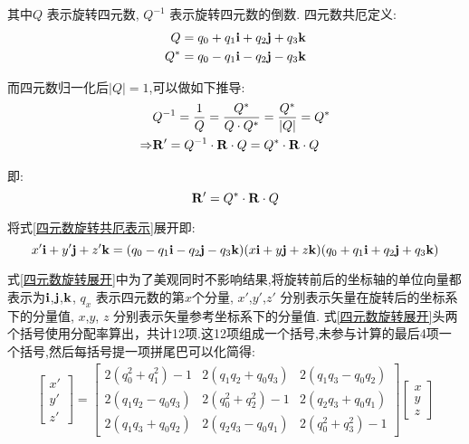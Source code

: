 其中$Q$         表示旋转四元数,
$Q^{-1}$        表示旋转四元数的倒数.
四元数共厄定义:
\begin{equation}\label{四元数共厄}
    \begin{split}
        Q   & = q_0 + q_1\mathbf{i} + q_2\mathbf{j} + q_3\mathbf{k} \\
        Q^* & = q_0 - q_1\mathbf{i} - q_2\mathbf{j} - q_3\mathbf{k}
    \end{split}
\end{equation} 

而四元数归一化后$|Q|=1$,可以做如下推导:
\begin{equation*}
    \begin{split}
                    & Q^{-1} = \frac{1}{Q} = \frac{Q^*}{Q \cdot Q^*} = \frac{Q^*}{|Q|} = Q^* \\
        \Rightarrow & \mathbf{R}'= Q^{-1} \cdot \mathbf{R} \cdot Q = Q^* \cdot \mathbf{R} \cdot Q
    \end{split}
\end{equation*}

即:
\begin{equation}\label{四元数旋转共厄表示}
    \mathbf{R}'= Q^* \cdot \mathbf{R} \cdot Q
\end{equation}

将式\ref{四元数旋转共厄表示}展开即:
\begin{equation}\label{四元数旋转展开}
    x'\mathbf{i} + y'\mathbf{j} + z'\mathbf{k} = (q_0 - q_1\mathbf{i} - q_2\mathbf{j} -q_3\mathbf{k})(x\mathbf{i} + y\mathbf{j} + z\mathbf{k})(q_0 + q_1\mathbf{i} + q_2\mathbf{j} + q_3\mathbf{k})
\end{equation}

式\ref{四元数旋转展开}中为了美观同时不影响结果,将旋转前后的坐标轴的单位向量都表示为$\mathbf{i}$,$\mathbf{j}$,$\mathbf{k}$,
$q_x$           表示四元数的第$x$个分量,
$x'$,$y'$,$z'$  分别表示矢量在旋转后的坐标系下的分量值,
$x$,$y$, $z$    分别表示矢量参考坐标系下的分量值.
式\ref{四元数旋转展开}头两个括号使用分配率算出，共计12项.这12项组成一个括号,未参与计算的最后4项一个括号,然后每括号提一项拼尾巴可以化简得:
\begin{equation}\label{四元数旋转}
    \begin{split}
        \left[\begin{matrix}
                x' \\
                y' \\
                z'
        \end{matrix}\right]
        =
        \left[\begin{matrix}
                2(q_0^2+q_1^2)-1 & 2(q_1q_2+q_0q_3) & 2(q_1q_3-q_0q_2) \\
                2(q_1q_2-q_0q_3) & 2(q_0^2+q_2^2)-1 & 2(q_2q_3+q_0q_1) \\
                2(q_1q_3+q_0q_2) & 2(q_2q_3-q_0q_1) & 2(q_0^2+q_3^2)-1
        \end{matrix}\right]
        \left[\begin{matrix}
                x \\
                y \\
                z
        \end{matrix}\right]
    \end{split}
\end{equation}

